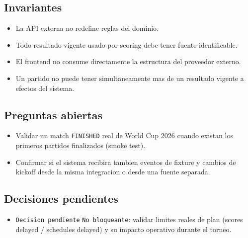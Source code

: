 \subsection{Invariantes}

\begin{itemize}
  \item La API externa no redefine reglas del dominio.
  \item Todo resultado vigente usado por scoring debe tener fuente identificable.
  \item El frontend no consume directamente la estructura del proveedor externo.
  \item Un partido no puede tener simultaneamente mas de un resultado vigente a efectos del sistema.
\end{itemize}

\subsection{Preguntas abiertas}

\begin{itemize}
  \item Validar un match \texttt{FINISHED} real de World Cup 2026 cuando existan los primeros partidos finalizados (smoke test).
  \item Confirmar si el sistema recibira tambien eventos de fixture y cambios de kickoff desde la misma integracion o desde una fuente separada.
\end{itemize}

\subsection{Decisiones pendientes}

\begin{itemize}
  \item \texttt{Decision pendiente} \texttt{No bloqueante}: validar limites reales de plan (scores delayed / schedules delayed) y su impacto operativo durante el torneo.
\end{itemize}
